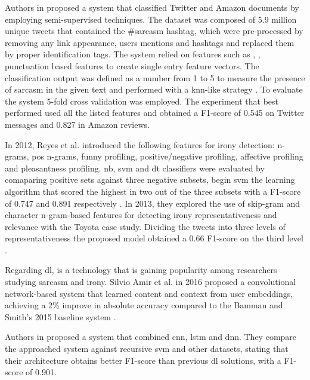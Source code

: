 Authors in \cite{davidov2010semi} proposed a system that classified Twitter and Amazon documents by employing semi-supervised techniques. The dataset was composed of 5.9 million unique tweets that contained the \#sarcasm hashtag, which were pre-processed by removing any link appearance, users mentions and hashtags and replaced them by proper identification tags. The system relied on features such as , , punctuation based features to create single entry feature vectors. The classification output was defined as a number from 1 to 5 to measure the presence of sarcasm in the given text and performed with a \acrfull{knn}-like strategy \cite{davidov2010enhanced}. To evaluate the system 5-fold cross validation was employed. The experiment that best performed used all the listed features and obtained a F1-score of 0.545 on Twitter messages and 0.827 in Amazon reviews.

In 2012, Reyes et al. introduced the following features for irony detection: n-grams, \acrfull{pos} n-grams, funny profiling, positive/negative profiling, affective profiling and pleasantness profiling. \acrshort{nb}, \acrshort{svm} and \acrfull{dt} classifiers were evaluated by comaparing positive sets against three negative subsets, begin \acrshort{svm} the learning algorithm that scored the highest in two out of the three subsets with a F1-score of 0.747 and 0.891 respectively \cite{reyes2012making}. In 2013, they explored the use of skip-gram and character n-gram-based features for detecting irony representativeness and relevance with the Toyota case study. Dividing the tweets into three levels of representativeness the proposed model obtained a 0.66 F1-score on the third level \cite{reyes2013multidimensional}.

Regarding \acrshort{dl}, is a technology that is gaining popularity among researchers studying sarcasm and irony. Silvio Amir et al. in 2016 proposed a convolutional network-based system that learned content and context from user embeddings, achieving a 2\% improve in absolute accuracy compared to the Bamman and Smith's 2015 baseline system \cite{amir2016modelling}. 

Authors in \cite{ghosh2016fracking} proposed a system that combined \acrfull{cnn}, \acrfull{lstm} and \acrfull{dnn}. They compare the approached system against recursive \acrshort{svm} and other datasets, stating that their architecture obtains better F1-score than previous \acrshort{dl} solutions, with a F1-score of 0.901.